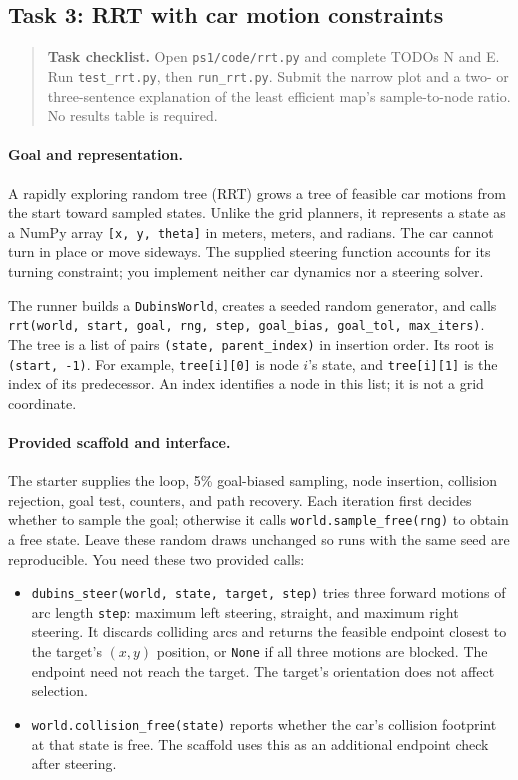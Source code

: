 \documentclass[11pt]{article}
\begin{document}
\clearpage
\subsection{Task 3: RRT with car motion constraints}

\begin{quote}\small
\textbf{Task checklist.} Open \texttt{ps1/code/rrt.py} and complete
TODOs N and E. Run \texttt{test\_rrt.py}, then \texttt{run\_rrt.py}.
Submit the narrow plot and a two- or three-sentence explanation of the
least efficient map's sample-to-node ratio. No results table is required.
\end{quote}

\paragraph{Goal and representation.}
A rapidly exploring random tree (RRT) grows a tree of feasible car
motions from the start toward sampled states. Unlike the grid planners,
it represents a state as a NumPy array \texttt{[x, y, theta]} in meters,
meters, and radians. The car cannot turn in place or move sideways.
The supplied steering function accounts for its turning constraint;
you implement neither car dynamics nor a steering solver.

The runner builds a \texttt{DubinsWorld}, creates a seeded random
generator, and calls
\texttt{rrt(world, start, goal, rng, step, goal\_bias, goal\_tol, max\_iters)}.
The tree is a list of pairs \texttt{(state, parent\_index)} in insertion
order. Its root is \texttt{(start, -1)}. For example,
\texttt{tree[i][0]} is node $i$'s state, and \texttt{tree[i][1]} is
the index of its predecessor. An index identifies a node in this list;
it is not a grid coordinate.

\paragraph{Provided scaffold and interface.}
The starter supplies the loop, 5\% goal-biased sampling, node insertion,
collision rejection, goal test, counters, and path recovery. Each
iteration first decides whether to sample the goal; otherwise it calls
\texttt{world.sample\_free(rng)} to obtain a free state. Leave these
random draws unchanged so runs with the same seed are reproducible.
You need these two provided calls:
\begin{itemize}
\item \texttt{dubins\_steer(world, state, target, step)} tries three
forward motions of arc length \texttt{step}: maximum left steering,
straight, and maximum right steering. It discards colliding arcs and
returns the feasible endpoint closest to the target's $(x,y)$ position,
or \texttt{None} if all three motions are blocked. The endpoint need
not reach the target. The target's orientation does not affect selection.
\item \texttt{world.collision\_free(state)} reports whether the car's
collision footprint at that state is free. The scaffold uses this as
an additional endpoint check after steering.
\end{itemize}
\end{document}

